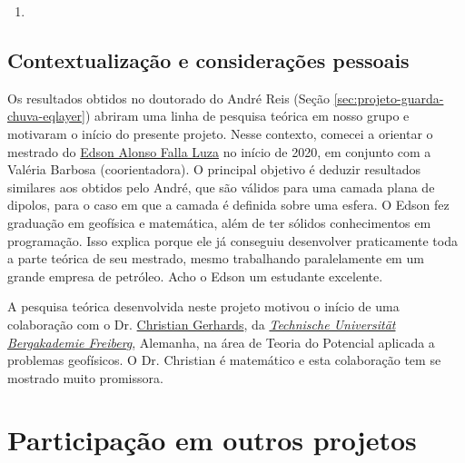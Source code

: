 \begin{enumerate}
	
	\item{}
	
\end{enumerate}

\subsection*{Contextualização e considerações pessoais}

Os resultados obtidos no doutorado do André Reis 
(Seção \ref{sec:projeto-guarda-chuva-eqlayer}) abriram uma linha de pesquisa teórica
em nosso grupo e motivaram o início do presente projeto.
Nesse contexto, comecei a orientar o mestrado do
\href{https://lattes.cnpq.br/4225133150519568}{Edson Alonso Falla Luza} no início
de 2020, em conjunto com a Valéria Barbosa (coorientadora).
O principal objetivo é deduzir resultados similares aos obtidos pelo André, que são válidos 
para uma camada plana de dipolos, para o caso em que a camada é definida sobre uma esfera.
O Edson fez graduação em geofísica e matemática, além de ter sólidos conhecimentos em 
programação. Isso explica porque ele já conseguiu desenvolver praticamente toda a
parte teórica de seu mestrado, mesmo trabalhando paralelamente em um grande empresa
de petróleo. Acho o Edson um estudante excelente.

A pesquisa teórica desenvolvida neste projeto motivou o início de uma colaboração com o 
Dr. \href{https://tu-freiberg.de/en/fakult3/gy/mageo/members}{Christian Gerhards},
da \href{https://tu-freiberg.de/universitaet}{\textsl{Technische Universität Bergakademie Freiberg}}, Alemanha, na área de Teoria do Potencial aplicada a problemas geofísicos.
O Dr. Christian é matemático e esta colaboração tem se mostrado muito promissora.




\section{Participação em outros projetos} 
\label{sec:outros-projeto}

